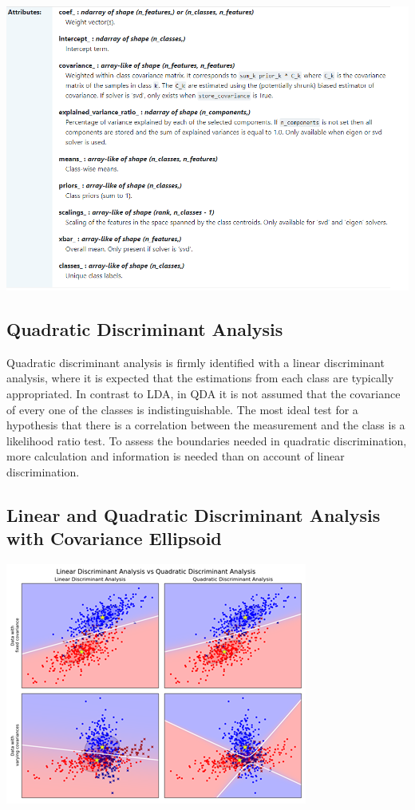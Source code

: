 \documentclass[a4paper,12pt]{report}
\begin{document}
\begin{center}
    \captionsetup{type=figure}
    \includegraphics[width=.5\linewidth]{media/Attributes.png}
\end{center}

\subsection{Quadratic Discriminant Analysis}
 
Quadratic discriminant analysis is firmly identified with a linear discriminant analysis, where it is expected that the estimations from each class are typically appropriated. In contrast to LDA, in QDA it is not assumed that the covariance of every one of the classes is indistinguishable. The most ideal test for a hypothesis that there is a correlation between the measurement and the class is a likelihood ratio test. To assess the boundaries needed in quadratic discrimination, more calculation and information is needed than on account of linear discrimination.

\subsection{Linear and Quadratic Discriminant Analysis with Covariance Ellipsoid}

\begin{center}
    \captionsetup{type=figure}
    \includegraphics[width=.9\linewidth]{media/LDAQDAwithellipsoid.png}
\end{center}
\end{document}
